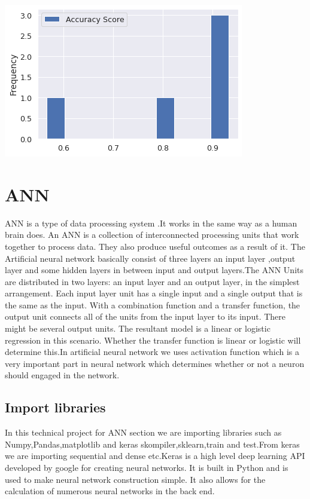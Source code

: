 \documentclass[journal,twoside,web]{ieeecolor}
\begin{document}
\includegraphics[scale=0.5]{accuracy 1.png}

\section{ANN}
ANN is a type of data processing system .It works in the same way as a human brain does. An ANN is a collection of interconnected processing units that work together to process data. They also produce useful outcomes as a result of it.
The Artificial neural network basically consist of three layers an input layer ,output layer and some hidden layers in between input and output layers.The ANN Units are distributed in two layers: an input layer and an output layer, in the simplest arrangement. Each input layer unit has a single input and a single output that is the same as the input. With a combination function and a transfer function, the output unit connects all of the units from the input layer to its input. There might be several output units. The resultant model is a linear or logistic regression in this scenario. Whether the transfer function is linear or logistic will determine this.In artificial neural network we uses activation function which is a very important part in neural network which determines whether or not a neuron should engaged in the network.

\subsection{Import libraries}
In this technical project for ANN section we are importing libraries such as Numpy,Pandas,matplotlib and keras skompiler,sklearn,train and test.From keras we are importing sequential and dense etc.Keras is a high level deep learning API developed by google for creating neural networks. It is built in Python and is used to make neural network construction simple. It also allows for the calculation of numerous neural networks in the back end.
\end{document}
